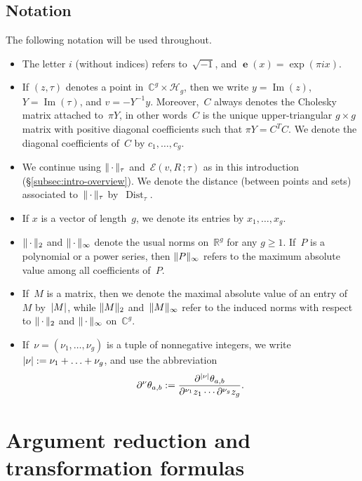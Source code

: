 \documentclass[12pt,oneside]{amsart}
\numberwithin{equation}{section}
\theoremstyle{definition}
\newcommand{\R}{\mathbb{R}}
\newcommand{\C}{\mathbb{C}}
\newcommand{\Half}{\mathcal{H}}
\newcommand{\placeholder}{\,\cdot\,}
\newcommand{\eld}[3]{\ensuremath{\mathcal{E}(#1, #2\,; #3)}}
\DeclareMathOperator{\im}{Im}
\DeclareMathOperator{\Dist}{Dist}
\DeclareMathOperator{\e}{\mathbf{e}}
\DeclarePairedDelimiter{\abs}{|}{|}
\DeclarePairedDelimiter{\norm}{\|}{\|}
\begin{document}
\subsection{Notation}
\label{subsec:notation}

The following notation will be used throughout.
\begin{itemize}
\item The letter $i$ (without indices) refers to~$\sqrt{-1}$, and $\e(x) = \exp(\pi i x)$.
\item If $(z,\tau)$ denotes a point in~$\C^g\times \Half_g$, then we write
  $y = \im(z)$,~$Y = \im(\tau)$, and $v = -Y^{-1}y$. Moreover,~$C$ always
  denotes the Cholesky matrix attached to~$\pi Y$, in other words~$C$ is the
  unique upper-triangular $g\times g$ matrix with positive diagonal
  coefficients such that $\pi Y = C^T C$. We denote the diagonal coefficients
  of~$C$ by $c_1,\ldots,c_g$.
\item We continue using $\norm{\placeholder}_\tau$ and~$\eld{v}{R}{\tau}$ as in
  this introduction (§\ref{subsec:intro-overview}). We denote the distance
  (between points and sets) associated to~$\norm{\placeholder}_\tau$
  by~$\Dist_\tau$.
\item If $x$ is a vector of length~$g$, we denote its entries by
  $x_1,\ldots, x_g$.
\item $\norm{\placeholder}_2$ and $\norm{\placeholder}_\infty$ denote the usual
  norms on~$\R^g$ for any $g\geq 1$. If~$P$ is a polynomial or a power series,
  then $\norm{P}_\infty$ refers to the maximum absolute value among all
  coefficients of~$P$.
\item If~$M$ is a matrix, then we denote the maximal absolute value of an entry
  of~$M$ by~$\abs{M}$, while $\norm{M}_2$ and~$\norm{M}_\infty$ refer to the
  induced norms with respect to $\norm{\placeholder}_2$ and
  $\norm{\placeholder}_\infty$ on~$\C^g$.
\item If~$\nu = (\nu_1,\ldots,\nu_g)$ is a tuple of nonnegative integers, we
  write $\abs{\nu} := \nu_1+\ldots+\nu_g$, and use the abbreviation
  \begin{displaymath}
    \partial^\nu\theta_{a,b} := \frac{\partial^{\abs{\nu}}\theta_{a,b}}{\partial^{\nu_1} z_1\cdots \partial^{\nu_g} z_g}.
  \end{displaymath}
\end{itemize}

\section{Argument reduction and transformation formulas}
\label{sec:reduction}
\end{document}
